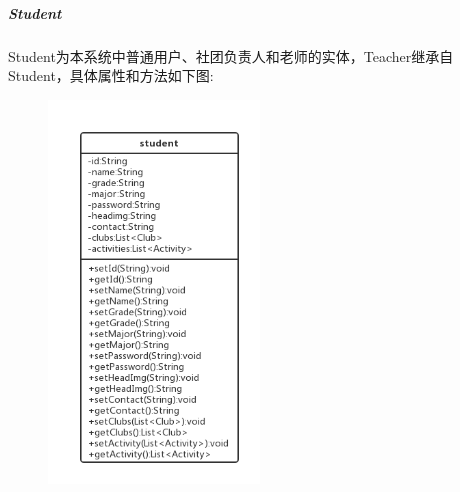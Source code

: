 \documentclass[UTF8]{ctexart}
\begin{document}
\subparagraph{Student}
Student为本系统中普通用户、社团负责人和老师的实体，Teacher继承自Student，具体属性和方法如下图:
\newline
\begin{figure}[H]
\centering
\includegraphics[width = 0.5\textwidth]{student-class.png}
\end{figure}
\end{document}
